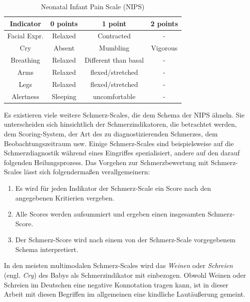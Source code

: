 \begin{table}[h]

	\centering
	\caption[Neonatal Infant Pain Scale]{Neonatal Infant Pain Scale (NIPS) \cite{nips}}
	\label{tab:nips}
	\begin{tabular}{@{}cccc@{}}
		\toprule
		\textbf{Indicator}     & \textbf{0 points} & \textbf{1 point}     & \textbf{2 points} \\ \midrule
		Facial Expr. & Relaxed           & Contracted           & -                 \\
		Cry               & Absent            & Mumbling             & Vigorous          \\
		Breathing         & Relaxed           & Different than basal & -                 \\
		Arms              & Relaxed           & flexed/stretched     & -                 \\
		Legs              & Relaxed           & flexed/stretched     & -                 \\
		Alertness         & Sleeping          & uncomfortable        & -                 \\ \bottomrule
	\end{tabular}
\end{table}


Es existieren viele weitere Schmerz-Scales, die dem Schema der NIPS ähneln. Sie unterscheiden sich hinsichtlich der Schmerzindikatoren, die betrachtet werden, dem Scoring-System, der Art des zu diagnostizierenden Schmerzes, dem Beobachtungszeitraum usw. Einige Schmerz-Scales sind beispielsweise auf die Schmerzdiagnostik während eines Eingriffes spezialisiert, andere auf den darauf folgenden Heilungsprozess. Das Vorgehen zur Schmerzbewertung mit Schmerz-Scales lässt sich folgendermaßen verallgemeinern:

\begin{enumerate}
\item Es wird für jeden Indikator der Schmerz-Scale ein Score nach den angegebenen Kritierien vergeben.
\item Alle Scores werden aufsummiert und ergeben einen insgesamten Schmerz-Score.
\item Der Schmerz-Score wird nach einem von der Schmerz-Scale vorgegebenem Schema interpretiert.\cite{aboutKids}\cite{pat}
\end{enumerate}

In den meisten multimodalen Schmerz-Scales wird das \emph{Weinen} oder \emph{Schreien} (engl. \emph{Cry}) des Babys als Schmerzindikator mit einbezogen.\cite[S. 97 - 98]{painInNeonates} Obwohl Weinen oder Schreien im Deutschen eine negative Konnotation tragen kann, ist in dieser Arbeit mit diesen Begriffen im allgemeinen eine \glqq kindliche Lautäußerung\grqq{} gemeint. 

